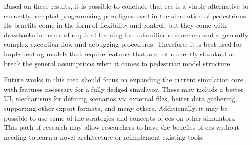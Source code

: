 \documentclass[twoside, 11pt]{article}
\begin{document}
Based on these results, it is possible to conclude that \gls{ecs} is a viable alternative to currently accepted programming paradigms used in the simulation of pedestrians. Its benefits come in the form of flexibility and control, but they come with drawbacks in terms of required learning for unfamiliar researchers and a generally complex execution flow and debugging procedures. Therefore, it is best used for implementing models that require features that are not currently standard or break the general assumptions when it comes to pedestrian model structure.

Future works in this area should focus on expanding the current simulation core with features necessary for a fully fledged simulator. These may include a better UI, mechanisms for defining scenarios via external files, better data gathering, supporting other export formats, and many others. Additionally, it may be possible to use some of the strategies and concepts of \gls{ecs} on other simulators. This path of research may allow researchers to have the benefits of \gls{ecs} without needing to learn a  novel architecture or reimplement existing tools.

\printbibliography
\end{document}
